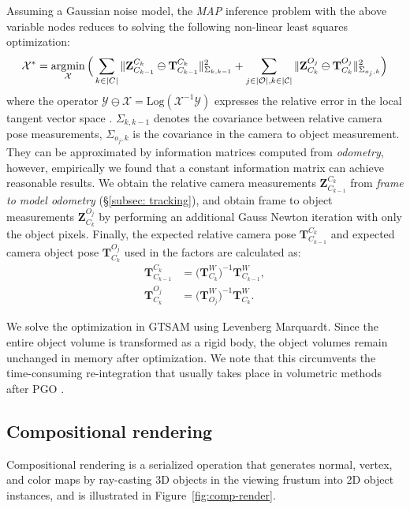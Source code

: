Assuming a Gaussian noise model, the \textit{MAP} inference problem with the above variable nodes reduces to solving the following non-linear least squares optimization:
\begin{align}
    \mathcal{X}^* = \operatorname*{\arg\!\min}_{\mathcal{X}} \Big( \sum_{k \in |C|} \|  \mathbf{Z}^{C_k}_{C_{k-1}} \ominus \mathbf{T}^{C_k}_{C_{k-1}} \|_{\Sigma_{k,k-1}}^2 + \sum_{j \in |\mathcal{O}|, k \in |\mathcal{C}|} \| \mathbf{Z}^{O_j}_{C_k} \ominus \mathbf{T}^{O_j}_{C_k} \|_{\Sigma_{o_j, k}}^2 \Big)
\end{align}
where the operator $ \mathcal{Y} \ominus \mathcal{X} = \text{Log}(\mathcal{X}^{-1} \mathcal{Y})$ expresses the relative error in the local tangent vector space \cite{solaMicroLieTheory2020}. $\Sigma_{k, k-1}$ denotes the covariance between relative camera pose measurements,  $\Sigma_{o_j, k}$ is the covariance in the camera to object measurement. They can be approximated by information matrices computed from \textit{odometry}, however, empirically we found that a constant information matrix can achieve reasonable results. We obtain the relative camera measurements $\mathbf{Z}^{C_k}_{C_{k-1}}$ from \textit{frame to model odometry} (\S\ref{subsec: tracking}), and obtain frame to object measurements $\mathbf{Z}^{O_j}_{C_k}$ by performing an additional Gauss Newton iteration with only the object pixels. Finally, the expected relative camera pose $\mathbf{T}^{C_k}_{C_{k-1}}$ and expected camera object pose $\mathbf{T}^{O_j}_{C_k}$ used in the factors are calculated as:
\begin{align}
    \mathbf{T}^{C_k}_{C_{k-1}} &= \bigg({\mathbf{T}^{W}_{C_k}}\bigg)^{-1} \mathbf{T}^{W}_{C_{k-1}}, \\
    \mathbf{T}^{O_j}_{C_k} &= \bigg({\mathbf{T}^{W}_{O_j}}\bigg)^{-1} \mathbf{T}^{W}_{C_k}.
\end{align}

We solve the optimization in GTSAM \cite{FactorGraphsGTSAM2019} using Levenberg Marquardt. Since the entire object volume is transformed as a rigid body, the object volumes remain unchanged in memory after optimization. We note that this circumvents the time-consuming re-integration that usually takes place in volumetric methods after PGO \cite{whelanElasticFusionDenseSLAM2015}.

\subsection{Compositional rendering} \label{subsec: rendering}
Compositional rendering is a serialized operation that generates normal, vertex, and color maps by ray-casting 3D objects in the viewing frustum into 2D object instances, and is illustrated in Figure~\ref{fig:comp-render}.

